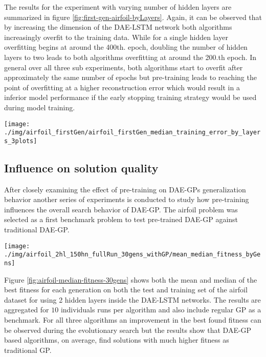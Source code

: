 \documentclass[
  11pt,
]{article}
\let\origfigure\figure
\let\endorigfigure\endfigure
\renewenvironment{figure}[1][2] {
    \expandafter\origfigure\expandafter[H]
} {
    \endorigfigure
}
\begin{document}
The results for the experiment with varying number of hidden layers are summarized in figure \ref{fig:first-gen-airfoil-byLayers}. Again, it can be observed that by increasing the dimension of the DAE-LSTM network both algorithms increasingly overfit to the training data. While for a single hidden layer overfitting begins at around the 400th. epoch, doubling the number of hidden layers to two leads to both algorithms overfitting at around the 200.th epoch. In general over all three sub experiments, both algorithms start to overfit after approximately the same number of epochs but pre-training leads to reaching the point of overfitting at a higher reconstruction error which would result in a inferior model performance if the early stopping training strategy would be used during model training.

\begin{figure}[c]

{\centering \texttt{[image: ./img/airfoil\_firstGen/airfoil\_firstGen\_median\_training\_error\_by\_layers\_3plots]} 

}

\caption{First Generation Median Reconstruction Error for variable number of hidden Layers}\label{fig:first-gen-airfoil-byLayers}
\end{figure}

\hypertarget{influence-on-solution-quality}{%
\subsection{Influence on solution quality}\label{influence-on-solution-quality}}

After closely examining the effect of pre-training on DAE-GPs generalization behavior another series of experiments is conducted to study how pre-training influences the overall search behavior of DAE-GP. The airfoil problem was selected as a first benchmark problem to test pre-trained DAE-GP against traditional DAE-GP.

\begin{figure}[c]

{\centering \texttt{[image: ./img/airfoil\_2hl\_150hn\_fullRun\_30gens\_withGP/mean\_median\_fitness\_byGens]} 

}

\caption{Best Fitness over 30 Generations - Airfoil}\label{fig:airfoil-median-fitness-30gens}
\end{figure}

Figure \ref{fig:airfoil-median-fitness-30gens} shows both the mean and median of the best fitness for each generation on both the test and training set of the airfoil dataset for using 2 hidden layers inside the DAE-LSTM networks. The results are aggregated for \(10\) individuals runs per algorithm and also include regular GP as a benchmark. For all three algorithms an improvement in the best found fitness can be observed during the evolutionary search but the results show that DAE-GP based algorithms, on average, find solutions with much higher fitness as traditional GP.
\end{document}
